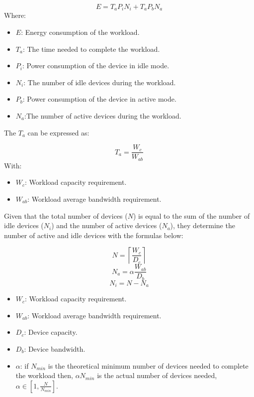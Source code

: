 \begin{equation}
    E = T_a P_i N_i + T_a P_b N_a
\end{equation}
Where:

\begin{itemize}
    \item $E$: Energy consumption of the workload.
    \item $T_a$: The time needed to complete the workload.
    \item $P_i$: Power consumption  of the device in idle mode.
    \item $N_i$: The number of idle devices during the workload.
    \item $P_b$: Power consumption of the device in active mode.
    \item $N_a$:The number of active devices during the workload.
\end{itemize}

The $T_a$ can be expressed as: 

\begin{equation}
    T_a = \frac{W_c}{W_{ab}}
\end{equation}
With:
\begin{itemize}
    \item $W_c$: Workload capacity requirement.
    \item $W_{ab}$: Workload average bandwidth requirement.
\end{itemize}

Given that the total number of devices ($N$) is equal to the sum of the number of idle devices ($N_i$) and the number of active devices ($N_a$), they determine the number of active and idle devices with the formulas below:

\begin{equation}
    N = \left \lceil {\frac{W_c}{D_c}} \right \rceil
\end{equation}
\begin{equation}
    N_a = \alpha \frac{W_{ab}}{D_b}
\end{equation}
\begin{equation}
    N_i = N - N_a
\end{equation}

\begin{itemize}
    \item $W_c$: Workload capacity requirement.
    \item $W_{ab}$: Workload average bandwidth requirement.
    \item $D_c$: Device capacity.
    \item $D_b$: Device bandwidth.
    \item $\alpha$: if $N_{min}$ is the theoretical minimum number of devices needed to complete the workload then, $\alpha N_{min}$ is the actual number of devices needed, $\alpha \in [1,\frac{N}{N_{min}}]$.
\end{itemize}


